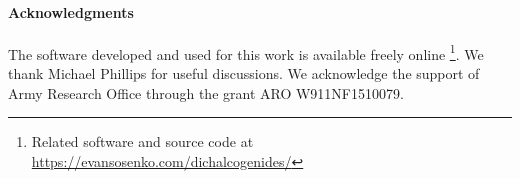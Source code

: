 \paragraph{Acknowledgments}

The software developed and used for this work
is available freely online
\footnote{%
  Related software and source code at \\
  \url{https://evansosenko.com/dichalcogenides/}
}.
We thank Michael Phillips for useful discussions.
We acknowledge the support of Army Research Office through the grant
ARO W911NF1510079.
